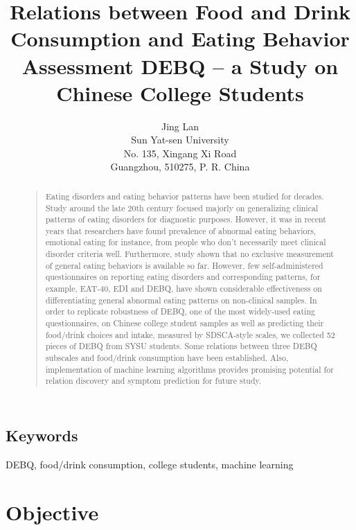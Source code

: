\documentclass[letterpaper]{article}
\begin{document}
\title{Relations between Food and Drink Consumption and Eating Behavior Assessment DEBQ -- a Study on Chinese College Students}
\author{Jing Lan\\
Sun Yat-sen University\\
No. 135, Xingang Xi Road \\
Guangzhou, 510275, P. R. China \\
}

\maketitle

\begin{abstract}
\begin{quote}
    Eating disorders and eating behavior patterns have been studied for decades.
    Study around the late 20th century focused majorly on generalizing clinical patterns 
    of eating disorders for diagnostic purposes. However, it was in recent years that researchers
    have found prevalence of abnormal eating behaviors, emotional eating for instance, from people who don't necessarily meet clinical
    disorder criteria well. Furthermore, study shown that no exclusive measurement of general eating behaviors is available so far. However, 
    few self-administered questionnaires on reporting eating disorders and corresponding patterns, for example, EAT-40, EDI and DEBQ, have shown
    considerable effectiveness on differentiating general abnormal eating patterns on non-clinical samples. In order to replicate robustness of DEBQ, one of the most
    widely-used eating questionnaires, on Chinese college student samples as well as predicting their food/drink choices and intake, measured by SDSCA-style scales,
    we collected 52 pieces of DEBQ from SYSU students. Some relations between three DEBQ subscales and food/drink consumption have been established.
    Also, implementation of machine learning algorithms provides promising potential for 
    relation discovery and symptom prediction for future study.  
\end{quote}
\end{abstract}

\subsection{Keywords}
DEBQ, food/drink consumption, college students, machine learning

\section{Objective}
\end{document}

